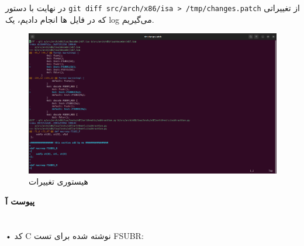 \documentclass[12pt]{exam}
\begin{document}
\begin{multicols}{1}
در نهایت با دستور \texttt{git diff src/arch/x86/isa > /tmp/changes.patch} از تغییراتی که در فایل ها انجام دادیم، یک log می‌گیریم.

\begin{center}
	\begin{figure}[H]
		\includegraphics[scale=0.13]{images/img5.png}
		\caption{هیستوری تغییرات}
		\label{هیستوری تغییرات}
	\end{figure}
\end{center}




	
	
\end{multicols}












\newpage
\fontsize{30}{30} \textbf{پیوست آ\label{پیوست آ}} \\ \\ \\


• کد C نوشته شده برای تست FSUBR: 
\begin{latin}
	
\end{latin}
\end{document}
